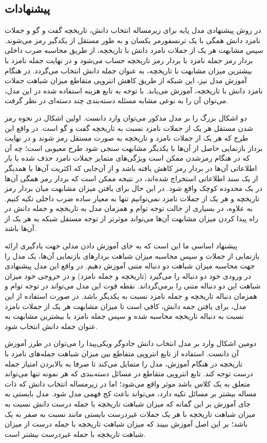 \subsection{پیشنهادات} \label{chap4:solution:recom}

در روش پیشنهادی مدل پایه برای زیرمساله انتخاب دانش، تاریخچه گفت و گو و جملات نامزد دانش همگی با یک ترنسفورمر یکسان و به طور مستقل از یکدگیر رمز می‌شوند. سپس مشابهت هر یک از جملات نامزد دانش با تاریخچه، از طریق محاسبه ضرب داخلی بردار رمز جمله نامزد با بردار رمز تاریخچه حساب می‌‌شود و در نهایت
جمله نامزد با بیشترین میزان مشابهت با تاریخچه، به عنوان جمله دانش انتخاب می‌گردد. در هنگام آموزش مدل نیز،‌ این شبکه از طریق کاهش انتروپی متقاطع میزان شباهت جملات نامزد دانش با تاریخچه، آموزش می‌یابد. با توجه به تابع هزینه استفاده شده در این مدل، می‌توان آن را به نوعی مشابه مسئله دسته‌بندی چند دسته‌ای در نظر گرفت. 

دو اشکال بزرگ را بر مدل مذکور می‌توان وارد دانست. اولین اشکال در نحوه رمز شدن مستقل هر یک از جملات نامزد نسبت به تاریخچه گفت و گو است. در واقع این طرح که هر یک از جملات نامزد و تاریخچه به صورت مستقل رمز شوند و در نهایت برداز بازنمایی حاصل از آن‌ها با یکدیگر مشابهت سنجی شود طرح معیوبی است؛ چه آن که در هنگام رمزشدن ممکن است ويژگی‌های متمایز جملات نامزد حذف شده یا بار اطلاعاتی آن‌ها در بردار رمز کاهش یافته باشد و از آن‌جایی که اکثریت آن‌ها با همدیگر از یک سند اطلاعاتی استخراج شده‌اند، در نتیجه ممکن است که بردار رمز همگی‌ آن‌ها در یک محدوده کوچک واقع شود. در این حال برای یافتن میزان مشابهت میان بردار رمز تاریخچه و هر یک از جملات نامزد نمی‌توانیم تنها به معیار ساده ضرب داخلی تکیه کنیم. به علاوه، در بسیاری از حالت توجه توام و همزمان مدل به تاریخچه و جمله دانش در راه پیدا کردن میزان مشابهت آن‌ها می‌تواند موثرتر از توجه مستقل شبکه به هر یک از آن‌ها باشد. 

پیشنهاد اساسی ما این است که به جای آموزش دادن مدلی جهت یادگیری ارائه بازنمایی از جملات و سپس محاسبه میزان شباهت بردار‌های بازنمایی آن‌ها، یک مدل را جهت محاسبه میزان شباهت دو دنباله متنی آموزش دهیم. در واقع این مدل پیشنهادی در ورودی خود دو دنباله را می‌گیرد (تاریخچه و جمله نامزد) و در خروجی خود میزان شباهت این دو دنباله متنی را برمی‌گرداند. نقطه قوت این مدل می‌تواند در توجه توام و همزمان دنباله تاریخچه و جمله نامزد نسبت به یکدیگر باشد. در صورت استفاده از این مدل، برای یافتن جمه دانش، کافی است تا میزان مشابهت هر یک از جملات نامزد نسبت به دنباله تاریخچه محاسبه شده و سپس جمله‌ نامزد با بیشترین مشابهت به عنوان جمله دانش انتخاب شود. 

دومین اشکال وارد بر مدل انتخاب دانش جادوگر ویکی‌پیدا را می‌توان در طرز آموزش آن دانست. استفاده از تابع انتروپی متفاطع بین میزان شباهت جمله‌های نامزد با تاریخچه در هنگام آموزش، مدل را متمایل می‌کند تا صرفا به بالابردن امتیاز جمله درست توجه کند. تابع انتروپی متقاطع در مسائل دسته‌بندی که هر نمونه تنها می‌تواند متعلق به یک کلاس باشد موثر واقع می‌شود؛ اما در زیرمساله انتخاب دانش که ذات مساله بیشتر بر مسائل
تکیه دارد، می‌تواند باعث کج فهمی مدل شود. مدل بایستی به جای آموزش بر این گمانه که میزان شباهت تاریخچه با جمله درست دانش نسبت به میزان شباهت تاریخچه با هر یک جملات غیردرست بایستی مانند نسبت به صفر به یک باشد؛ بر این اصل آموزش ببیند که میزان شباهت تاریخچه با جمله درست از میزان شباهت تاریخچه با جمله غیردرست بیشتر است. 

